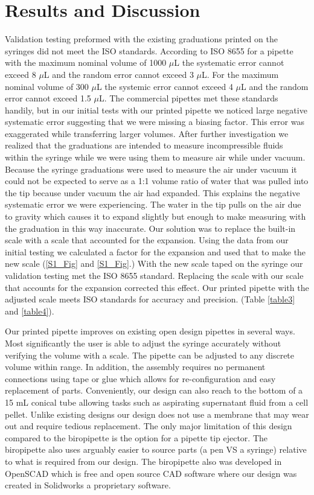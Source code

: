 \documentclass{nature}
\begin{document}
\section*{Results and Discussion}
Validation testing preformed with the existing graduations printed on the syringes did not meet the ISO standards.
According to ISO 8655 for a pipette with the maximum nominal volume of 1000 $\mu$L the systematic error cannot exceed 8 $\mu$L and the random error cannot exceed 3 $\mu$L.
For the maximum nominal volume of 300 $\mu$L the systemic error cannot exceed 4 $\mu$L and the random error cannot exceed 1.5 $\mu$L.
The commercial pipettes met these standards handily, but in our initial tests with our printed pipette we noticed large negative systematic error suggesting that we were missing a biasing factor. 
This error was exaggerated while transferring larger volumes.
After further investigation we realized that the graduations are intended to measure incompressible fluids within the syringe while we were using them to measure air while under vacuum.
Because the syringe graduations were used to measure the air under vacuum it could not be expected to serve as a 1:1 volume ratio of water that was pulled into the tip because under vacuum the air had expanded.
This explains the negative systematic error we were experiencing.
The water in the tip pulls on the air due to gravity which causes it to expand slightly but enough to make measuring with the graduation in this way inaccurate.
Our solution was to replace the built-in scale with a scale that accounted for the expansion.
Using the data from our initial testing we calculated a factor for the expansion and used that to make the new scale (\ref{S1_Fig} and \ref{S1_Fig}.)
With the new scale taped on the syringe our validation testing met the ISO 8655 standard.
Replacing the scale with our scale that accounts for the expansion corrected this effect. 
Our printed pipette with the adjusted scale meets ISO standards for accuracy and precision. (Table \ref{table3} and \ref{table4}).

Our printed pipette improves on existing open design pipettes in several ways. 
Most significantly the user is able to adjust the syringe accurately without verifying the volume with a scale.
The pipette can be adjusted to any discrete volume within range.
In addition, the assembly requires no permanent connections using tape or glue which allows for re-configuration and easy replacement of parts.
Conveniently, our design can also reach to the bottom of a 15 mL conical tube allowing tasks such as aspirating supernatant fluid from a cell pellet.
Unlike existing designs our design does not use a membrane that may wear out and require tedious replacement.
The only major limitation of this design compared to the biropipette is the option for a pipette tip ejector.
The biropipette also uses arguably easier to source parts (a pen VS a syringe) relative to what is required from our design.
The biropipette also was developed in OpenSCAD which is free and open source CAD software where our design was created in Solidworks a proprietary software. 
\end{document}
